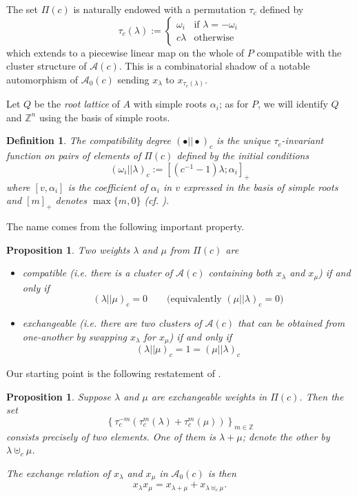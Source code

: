 \documentclass[11pt]{amsart}
\newcommand{\cA}{\mathcal{A}}
\newcommand{\ZZ}{\mathbb{Z}}
\newtheorem{definition}[theorem]{Definition}
\newtheorem{proposition}[theorem]{Proposition}
\numberwithin{equation}{section}
\begin{document}
  The set $\Pi(c)$ is naturally endowed with a permutation $\tau_c$ defined by
  \[
    \tau_c (\lambda) 
    :=
    \begin{cases}
      \omega_i  & \text{if $\lambda = -\omega_i$} \\
      c\lambda  & \text{otherwise}
    \end{cases}
  \]
  which extends to a piecewise linear map on the whole of $P$ compatible with the cluster structure of $\cA(c)$.
  This is a combinatorial shadow of a notable automorphism of $\cA_0(c)$ sending $x_\lambda$ to $x_{\tau_c(\lambda)}$. 

  Let $Q$ be the \emph{root lattice} of $A$ with simple roots $\alpha_i$; as for $P$, we will identify $Q$ and $\ZZ^n$ using the basis of simple roots.
  \begin{definition}
    The \emph{compatibility degree} $(\bullet||\bullet)_c$ is the unique $\tau_c$-invariant function on pairs of elements of $\Pi(c)$ defined by the initial conditions
    \[
      (\omega_i||\lambda)_c
      :=
      \left[ (c^{-1}-1)\lambda ; \alpha_i\right]_+
    \]
    where $[v,\alpha_i]$ is the coefficient of $\alpha_i$ in $v$ expressed in the basis of simple roots and $[m]_+$  denotes $\max\{m, 0\}$ (cf. \cite[Proposition 5.1]{YZ08}).
  \end{definition}
  The name comes from the following important property.
  \begin{proposition}
    Two weights $\lambda$ and $\mu$ from $\Pi(c)$ are
    \begin{itemize}
      \item
        \emph{compatible} (i.e. there is a cluster of $\cA(c)$ containing both $x_\lambda$ and $x_\mu$) if and only if
        \[
          (\lambda||\mu)_c = 0
          \quad \quad
          \text{(equivalently $(\mu||\lambda)_c=0$)}
        \]

      \item
        \emph{exchangeable} (i.e. there are two clusters of $\cA(c)$ that can be obtained from one-another by swapping $x_\lambda$ for $x_\mu$) if and only if
        \[
          (\lambda||\mu)_c = 1 = (\mu||\lambda)_c
        \]
    \end{itemize}
  \end{proposition}

  Our starting point is the following restatement of \cite[Propositions 5.1 and 5.2]{Ste13}. 
  \begin{proposition}
    Suppose $\lambda$ and $\mu$ are exchangeable weights in $\Pi(c)$. 
    Then the set
    \[
      \left\{
        \tau_c^{-m}\left(\tau_c^m(\lambda)+\tau_c^m(\mu)\right)
      \right\}_{m\in\ZZ}
    \]
    consists precisely of two elements. One of them is $\lambda+\mu$; denote the other by $\lambda\uplus_c\mu$.

    The exchange relation of $x_\lambda$ and $x_\mu$ in $\cA_0(c)$ is then
    \[
      x_\lambda x_\mu = x_{\lambda+\mu} + x_{\lambda\uplus_c\mu}.
    \]
  \end{proposition}
\end{document}
